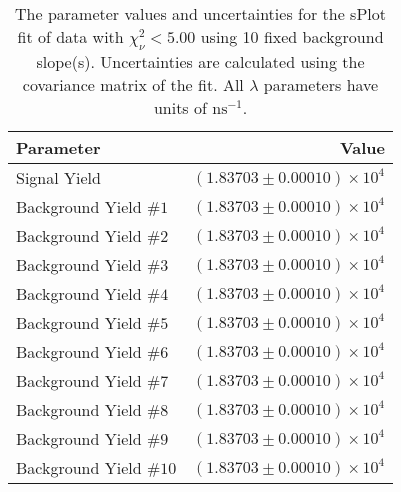 
\begin{table}
    \begin{center}
        \begin{tabular}{lr}\toprule
            Parameter & Value \\\midrule
            Signal Yield & $(1.83703 \pm 0.00010) \times 10^{4}$ \\
            Background Yield $\#1$ & $(1.83703 \pm 0.00010) \times 10^{4}$ \\
            Background Yield $\#2$ & $(1.83703 \pm 0.00010) \times 10^{4}$ \\
            Background Yield $\#3$ & $(1.83703 \pm 0.00010) \times 10^{4}$ \\
            Background Yield $\#4$ & $(1.83703 \pm 0.00010) \times 10^{4}$ \\
            Background Yield $\#5$ & $(1.83703 \pm 0.00010) \times 10^{4}$ \\
            Background Yield $\#6$ & $(1.83703 \pm 0.00010) \times 10^{4}$ \\
            Background Yield $\#7$ & $(1.83703 \pm 0.00010) \times 10^{4}$ \\
            Background Yield $\#8$ & $(1.83703 \pm 0.00010) \times 10^{4}$ \\
            Background Yield $\#9$ & $(1.83703 \pm 0.00010) \times 10^{4}$ \\
            Background Yield $\#10$ & $(1.83703 \pm 0.00010) \times 10^{4}$ \\\bottomrule
        \end{tabular}
        \caption{The parameter values and uncertainties for the sPlot fit of data with $\chi^2_\nu < 5.00$ using 10 fixed background slope(s). Uncertainties are calculated using the covariance matrix of the fit. All $\lambda$ parameters have units of $\si{\nano\second}^{-1}$.}
    \end{center}
\end{table}
